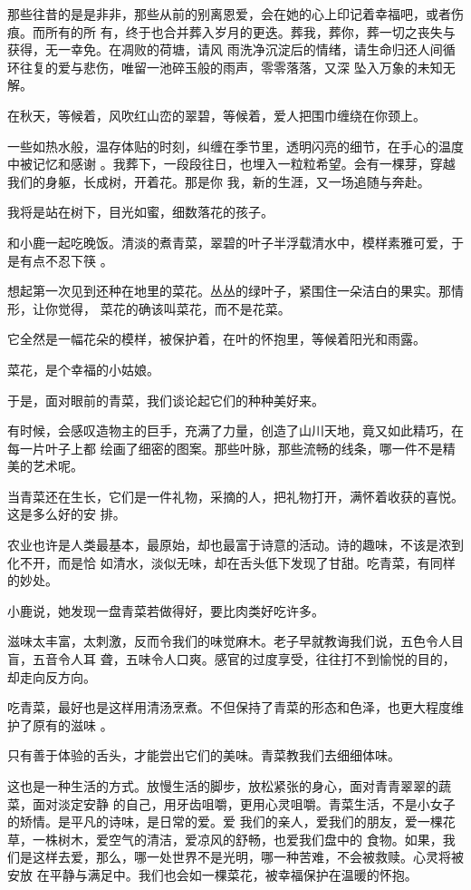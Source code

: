 \documentclass[12pt,a4paper]{article}
\begin{document}
		那些往昔的是是非非，那些从前的别离恩爱，会在她的心上印记着幸福吧，或者伤痕。而所有的所
	有，终于也合并葬入岁月的更迭。葬我，葬你，葬一切之丧失与获得，无一幸免。在凋败的荷塘，请风
	雨洗净沉淀后的情绪，请生命归还人间循环往复的爱与悲伤，唯留一池碎玉般的雨声，零零落落，又深
	坠入万象的未知无解。

		在秋天，等候着，风吹红山峦的翠碧，等候着，爱人把围巾缠绕在你颈上。

		一些如热水般，温存体贴的时刻，纠缠在季节里，透明闪亮的细节，在手心的温度中被记忆和感谢
	。我葬下，一段段往日，也埋入一粒粒希望。会有一棵芽，穿越我们的身躯，长成树，开着花。那是你
	我，新的生涯，又一场追随与奔赴。

		我将是站在树下，目光如蜜，细数落花的孩子。

	\endwriting



		和小鹿一起吃晚饭。清淡的煮青菜，翠碧的叶子半浮载清水中，模样素雅可爱，于是有点不忍下筷
	。

		想起第一次见到还种在地里的菜花。丛丛的绿叶子，紧围住一朵洁白的果实。那情形，让你觉得，
	菜花的确该叫菜花，而不是花菜。

		它全然是一幅花朵的模样，被保护着，在叶的怀抱里，等候着阳光和雨露。

		菜花，是个幸福的小姑娘。

		于是，面对眼前的青菜，我们谈论起它们的种种美好来。

		有时候，会感叹造物主的巨手，充满了力量，创造了山川天地，竟又如此精巧，在每一片叶子上都
	绘画了细密的图案。那些叶脉，那些流畅的线条，哪一件不是精美的艺术呢。

		当青菜还在生长，它们是一件礼物，采摘的人，把礼物打开，满怀着收获的喜悦。这是多么好的安
	排。

		农业也许是人类最基本，最原始，却也最富于诗意的活动。诗的趣味，不该是浓到化不开，而是恰
	如清水，淡似无味，却在舌头低下发现了甘甜。吃青菜，有同样的妙处。

		小鹿说，她发现一盘青菜若做得好，要比肉类好吃许多。

		滋味太丰富，太刺激，反而令我们的味觉麻木。老子早就教诲我们说，五色令人目盲，五音令人耳
	聋，五味令人口爽。感官的过度享受，往往打不到愉悦的目的，却走向反方向。

		吃青菜，最好也是这样用清汤烹煮。不但保持了青菜的形态和色泽，也更大程度维护了原有的滋味
	。

		只有善于体验的舌头，才能尝出它们的美味。青菜教我们去细细体味。

		这也是一种生活的方式。放慢生活的脚步，放松紧张的身心，面对青青翠翠的蔬菜，面对淡定安静
	的自己，用牙齿咀嚼，更用心灵咀嚼。青菜生活，不是小女子的矫情。是平凡的诗味，是日常的爱。爱
	我们的亲人，爱我们的朋友，爱一棵花草，一株树木，爱空气的清洁，爱凉风的舒畅，也爱我们盘中的
	食物。如果，我们是这样去爱，那么，哪一处世界不是光明，哪一种苦难，不会被救赎。心灵将被安放
	在平静与满足中。我们也会如一棵菜花，被幸福保护在温暖的怀抱。
\end{document}
